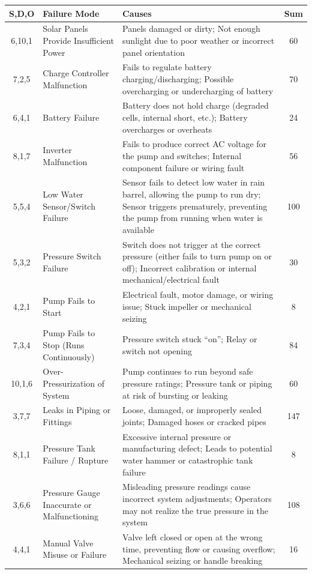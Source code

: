\documentclass[12pt]{report}
\begin{document}
\begin{itemize}
\begin{longtable}{|c|p{4cm}|p{8cm}|c|}
\textbf{S,D,O} & \textbf{Failure Mode} & \textbf{Causes} & \textbf{Sum} \\
\hline
6,10,1 & Solar Panels Provide Insufficient Power & Panels damaged or dirty; Not enough sunlight due to poor weather or incorrect panel orientation & 60 \\
\hline
7,2,5 & Charge Controller Malfunction & Fails to regulate battery charging/discharging; Possible overcharging or undercharging of battery & 70 \\
\hline
6,4,1 & Battery Failure & Battery does not hold charge (degraded cells, internal short, etc.); Battery overcharges or overheats & 24 \\
\hline
8,1,7 & Inverter Malfunction & Fails to produce correct AC voltage for the pump and switches; Internal component failure or wiring fault & 56 \\
\hline
5,5,4 & Low Water Sensor/Switch Failure & Sensor fails to detect low water in rain barrel, allowing the pump to run dry; Sensor triggers prematurely, preventing the pump from running when water is available & 100 \\
\hline
5,3,2 & Pressure Switch Failure & Switch does not trigger at the correct pressure (either fails to turn pump on or off); Incorrect calibration or internal mechanical/electrical fault & 30 \\
\hline
4,2,1 & Pump Fails to Start & Electrical fault, motor damage, or wiring issue; Stuck impeller or mechanical seizing & 8 \\
\hline
7,3,4 & Pump Fails to Stop (Runs Continuously) & Pressure switch stuck “on”; Relay or switch not opening & 84 \\
\hline
10,1,6 & Over-Pressurization of System & Pump continues to run beyond safe pressure ratings; Pressure tank or piping at risk of bursting or leaking & 60 \\
\hline
3,7,7 & Leaks in Piping or Fittings & Loose, damaged, or improperly sealed joints; Damaged hoses or cracked pipes & 147 \\
\hline
8,1,1 & Pressure Tank Failure / Rupture & Excessive internal pressure or manufacturing defect; Leads to potential water hammer or catastrophic tank failure & 8 \\
\hline
3,6,6 & Pressure Gauge Inaccurate or Malfunctioning & Misleading pressure readings cause incorrect system adjustments; Operators may not realize the true pressure in the system & 108 \\
\hline
4,4,1 & Manual Valve Misuse or Failure & Valve left closed or open at the wrong time, preventing flow or causing overflow; Mechanical seizing or handle breaking & 16 \\

\end{longtable}
\end{itemize}
\end{document}

